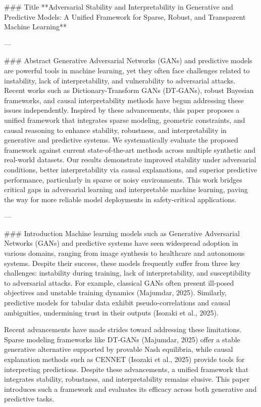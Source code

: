 ### Title  
**Adversarial Stability and Interpretability in Generative and Predictive Models: A Unified Framework for Sparse, Robust, and Transparent Machine Learning**

---

### Abstract  
Generative Adversarial Networks (GANs) and predictive models are powerful tools in machine learning, yet they often face challenges related to instability, lack of interpretability, and vulnerability to adversarial attacks. Recent works such as Dictionary-Transform GANs (DT-GANs), robust Bayesian frameworks, and causal interpretability methods have begun addressing these issues independently. Inspired by these advancements, this paper proposes a unified framework that integrates sparse modeling, geometric constraints, and causal reasoning to enhance stability, robustness, and interpretability in generative and predictive systems. We systematically evaluate the proposed framework against current state-of-the-art methods across multiple synthetic and real-world datasets. Our results demonstrate improved stability under adversarial conditions, better interpretability via causal explanations, and superior predictive performance, particularly in sparse or noisy environments. This work bridges critical gaps in adversarial learning and interpretable machine learning, paving the way for more reliable model deployments in safety-critical applications.

---

### Introduction  
Machine learning models such as Generative Adversarial Networks (GANs) and predictive systems have seen widespread adoption in various domains, ranging from image synthesis to healthcare and autonomous systems. Despite their success, these models frequently suffer from three key challenges: instability during training, lack of interpretability, and susceptibility to adversarial attacks. For example, classical GANs often present ill-posed objectives and unstable training dynamics (Majumdar, 2025). Similarly, predictive models for tabular data exhibit pseudo-correlations and causal ambiguities, undermining trust in their outputs (Isozaki et al., 2025).  

Recent advancements have made strides toward addressing these limitations. Sparse modeling frameworks like DT-GANs (Majumdar, 2025) offer a stable generative alternative supported by provable Nash equilibria, while causal explanation methods such as CENNET (Isozaki et al., 2025) provide tools for interpreting predictions. Despite these advancements, a unified framework that integrates stability, robustness, and interpretability remains elusive. This paper introduces such a framework and evaluates its efficacy across both generative and predictive tasks.

